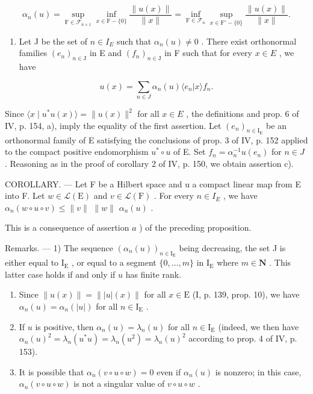 \[
\alpha_ {n} (u) = \sup _ {\mathrm{F} \in \mathscr {F} _ {n + 1}} \inf _ {x \in \mathrm{F} - \{0 \}} \frac {\| u (x) \|}{\| x \|} = \inf _ {\mathrm{F} \in \mathscr {F} _ {n}} \sup _ {x \in \mathrm{F} ^ {\circ} - \{0 \}} \frac {\| u (x) \|}{\| x \|}.
\]

\begin{enumerate}
\def\labelenumi{\alph{enumi})}
\setcounter{enumi}{1}
\tightlist
\item
  Let J be the set of \(n \in I_{E}\) such that \(\alpha_{n}(u) \neq 0\) . There exist orthonormal families \((e_{n})_{n \in \mathrm{J}}\) in E and \((f_{n})_{n \in \mathrm{J}}\) in F such that for every \(x \in E\) , we have
\end{enumerate}

\[
u (x) = \sum_ {n \in J} \alpha_ {n} (u) \langle e _ {n} | x \rangle f _ {n}.
\]

Since \(\langle x \mid u^{*}u(x)\rangle = \|u(x)\|^{2}\) for all \(x \in E\) , the definitions and prop. 6 of IV, p. 154, a), imply the equality of the first assertion. Let \((e_{n})_{n\in\mathrm{I}_{\mathrm{E}}}\) be an orthonormal family of E satisfying the conclusions of prop. 3 of IV, p. 152 applied to the compact positive endomorphism \(u^{*} \circ u\) of E. Set \(f_{n} = \alpha_{n}^{-1}u(e_{n})\) for \(n \in J\) . Reasoning as in the proof of corollary 2 of IV, p. 150, we obtain assertion c).

COROLLARY. --- Let F be a Hilbert space and u a compact linear map from E into F. Let \(w \in \mathcal{L}(\mathrm{E})\) and \(v \in \mathcal{L}(\mathrm{F})\) . For every \(n \in I_{E}\) , we have \(\alpha_{n}(w \circ u \circ v) \leqslant \|v\|\) \(\|w\|\) \(\alpha_{n}(u)\) .

This is a consequence of assertion \(a\) ) of the preceding proposition.

Remarks. --- 1) The sequence \((\alpha_{n}(u))_{n\in\mathrm{I}_{\mathrm{E}}}\) being decreasing, the set J is either equal to \(\mathrm{I}_{\mathrm{E}}\) , or equal to a segment \(\{0,\ldots,m\}\) in \(\mathrm{I}_{\mathrm{E}}\) where \(m\in\mathbf{N}\) . This latter case holds if and only if \(u\) has finite rank.

\begin{enumerate}
\def\labelenumi{\arabic{enumi})}
\setcounter{enumi}{1}
\item
  Since \(\| u(x)\| = \| |u|(x)\|\) for all \(x\in \mathrm{E}\) (I, p. 139, prop. 10), we have \(\alpha_{n}(u) = \alpha_{n}(|u|)\) for all \(n\in \mathrm{I}_{\mathrm{E}}\) .
\item
  If \(u\) is positive, then \(\alpha_{n}(u)=\lambda_{n}(u)\) for all \(n\in\mathrm{I}_{\mathrm{E}}\) (indeed, we then have \(\alpha_{n}(u)^{2}=\lambda_{n}(u^{*}u)=\lambda_{n}(u^{2})=\lambda_{n}(u)^{2}\) according to prop. 4 of IV, p. 153).
\item
  It is possible that \(\alpha_{n}(v\circ u\circ w)=0\) even if \(\alpha_{n}(u)\) is nonzero; in this case, \(\alpha_{n}(v\circ u\circ w)\) is not a singular value of \(v\circ u\circ w\) .
\end{enumerate}
\relax{}
